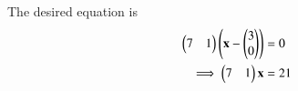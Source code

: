 The desired equation is
		\begin{align}
			\myvec{7 & 1}\brak{\vec{x}-\myvec{3\\0}} &=0\\
		\implies 	\myvec{7 & 1}\vec{x} &= 21
		\end{align}

